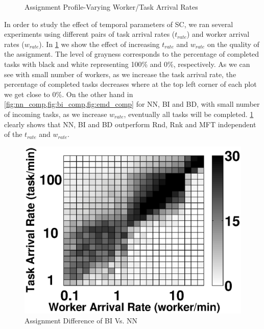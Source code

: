 \begin{figure}[h]
{    }
    \vspace{-0.15in}
    \caption{\small{Assignment Profile-Varying Worker/Task Arrival Rates}}
    \label{fig:tw_rate}
\end{figure}

In order to study the effect of temporal parameters of SC, we ran several experiments using different pairs of task arrival rates ($t_{rate}$) and worker arrival rates ($w_{rate}$). In \cref{fig:tw_rate} we show the effect of increasing $t_{rate}$ and $w_{rate}$ on the quality of the assignment. The level of grayness corresponds to the percentage of completed tasks with black and white representing 100\% and 0\%, respectively. As we can see with small number of workers, as we increase the task arrival rate, the percentage of completed tasks decreases where at the top left corner of each plot we get close to 0\%. On the other hand in \cref{fig:nn_comp,fig:bi_comp,fig:emd_comp} for NN, BI and BD, with small number of incoming tasks, as we increase $w_{rate}$, eventually all tasks will be completed. \cref{fig:tw_rate} clearly shows that NN, BI and BD outperform Rnd, Rnk and MFT independent of the $t_{rate}$ and $w_{rate}$.

\begin{figure}[h]
	\centering
	\includegraphics[width = 0.65\columnwidth]{figures/bi_nn.eps}
	\vspace{-0.1in}
	\caption{Assignment Difference of BI Vs. NN}\label{fig:bi_nn}
\end{figure}

